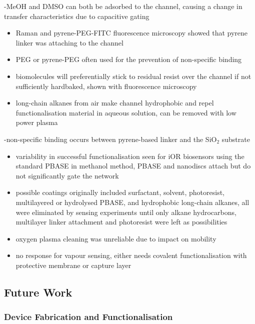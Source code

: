 \documentclass[
  letterpaper,
  DIV=11,
  numbers=noendperiod]{scrartcl}
\begin{document}
-MeOH and DMSO can both be adsorbed to the channel, causing a change in
transfer characteristics due to capacitive gating

\begin{itemize}
\item
  Raman and pyrene-PEG-FITC fluorescence microscopy showed that pyrene
  linker was attaching to the channel
\item
  PEG or pyrene-PEG often used for the prevention of non-specific
  binding
\item
  biomolecules will preferentially stick to residual resist over the
  channel if not sufficiently hardbaked, shown with fluorescence
  microscopy
\item
  long-chain alkanes from air make channel hydrophobic and repel
  functionalisation material in aqueous solution, can be removed with
  low power plasma
\end{itemize}

-non-specific binding occurs between pyrene-based linker and the
SiO\(_2\) substrate

\begin{itemize}
\item
  variability in successful functionalisation seen for iOR biosensors
  using the standard PBASE in methanol method, PBASE and nanodiscs
  attach but do not significantly gate the network
\item
  possible coatings originally included surfactant, solvent,
  photoresist, multilayered or hydrolysed PBASE, and hydrophobic
  long-chain alkanes, all were eliminated by sensing experiments until
  only alkane hydrocarbons, multilayer linker attachment and photoresist
  were left as possibilities
\item
  oxygen plasma cleaning was unreliable due to impact on mobility
\item
  no response for vapour sensing, either needs covalent
  functionalisation with protective membrane or capture layer
\end{itemize}

\hypertarget{sec-future-work}{%
\subsection{Future Work}\label{sec-future-work}}

\hypertarget{sec-future-work-fabrication}{%
\subsubsection{Device Fabrication and
Functionalisation}\label{sec-future-work-fabrication}}
\end{document}
